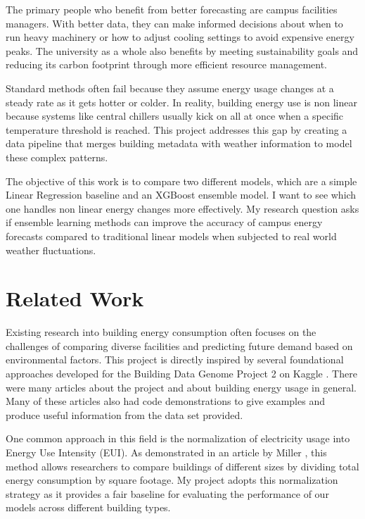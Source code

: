 \documentclass[conference]{IEEEtran}
\begin{document}
The primary people who benefit from better forecasting are campus facilities managers. With better data, they can make informed decisions about when to run heavy machinery or how to adjust cooling settings to avoid expensive energy peaks. The university as a whole also benefits by meeting sustainability goals and reducing its carbon footprint through more efficient resource management. 

Standard methods often fail because they assume energy usage changes at a steady rate as it gets hotter or colder. In reality, building energy use is non linear because systems like central chillers usually kick on all at once when a specific temperature threshold is reached. This project addresses this gap by creating a data pipeline that merges building metadata with weather information to model these complex patterns. 

The objective of this work is to compare two different models, which are a simple Linear Regression baseline and an XGBoost ensemble model. I want to see which one handles non linear energy changes more effectively. My research question asks if ensemble learning methods can improve the accuracy of campus energy forecasts compared to traditional linear models when subjected to real world weather fluctuations.





\section{Related Work}
Existing research into building energy consumption often focuses on the challenges of comparing diverse facilities and predicting future demand based on environmental factors. This project is directly inspired by several foundational approaches developed for the Building Data Genome Project 2 on Kaggle \cite{bdg2_dataset}. There were many articles about the project and about building energy usage in general. Many of these articles also had code demonstrations to give examples and produce useful information from the data set provided.

One common approach in this field is the normalization of electricity usage into Energy Use Intensity (EUI). As demonstrated in an article by Miller \cite{miller_eui}, this method allows researchers to compare buildings of different sizes by dividing total energy consumption by square footage. My project adopts this normalization strategy as it provides a fair baseline for evaluating the performance of our models across different building types. 
\end{document}

